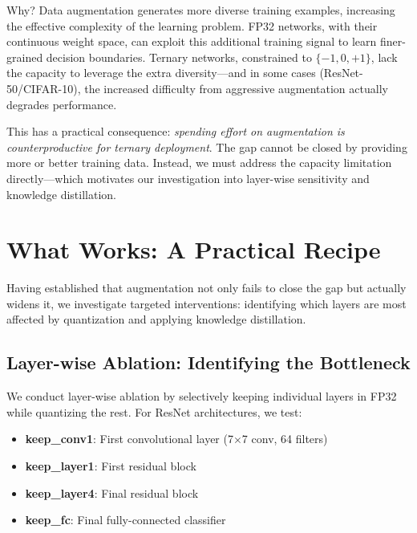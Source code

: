 \documentclass[10pt]{article}
\begin{document}
Why? Data augmentation generates more diverse training examples, increasing the effective complexity of the learning problem. FP32 networks, with their continuous weight space, can exploit this additional training signal to learn finer-grained decision boundaries. Ternary networks, constrained to $\{-1, 0, +1\}$, lack the capacity to leverage the extra diversity---and in some cases (ResNet-50/CIFAR-10), the increased difficulty from aggressive augmentation actually degrades performance.

This has a practical consequence: \emph{spending effort on augmentation is counterproductive for ternary deployment}. The gap cannot be closed by providing more or better training data. Instead, we must address the capacity limitation directly---which motivates our investigation into layer-wise sensitivity and knowledge distillation.


\section{What Works: A Practical Recipe}
\label{sec:recipe}

Having established that augmentation not only fails to close the gap but actually widens it, we investigate targeted interventions: identifying which layers are most affected by quantization and applying knowledge distillation.

\subsection{Layer-wise Ablation: Identifying the Bottleneck}

We conduct layer-wise ablation by selectively keeping individual layers in FP32 while quantizing the rest. For ResNet architectures, we test:
\begin{itemize}
    \item \textbf{keep\_conv1}: First convolutional layer (7$\times$7 conv, 64 filters)
    \item \textbf{keep\_layer1}: First residual block
    \item \textbf{keep\_layer4}: Final residual block
    \item \textbf{keep\_fc}: Final fully-connected classifier
\end{itemize}
\end{document}
